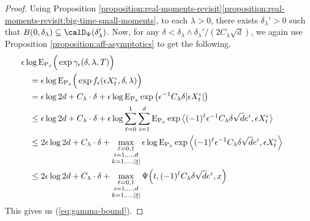\begin{proof}
  Using Proposition \ref{proposition:real-moments-revisit}\ref{proposition:real-moments-revisit:big-time-small-moments}, to each $\lambda > 0$, there exists $\delta_\lambda' > 0$ such that $B(0,\delta_\lambda) \subseteq \momentSpace(\delta_\lambda')$.
  Now, for any $\delta < \delta_\lambda \wedge \delta_\lambda'/(2C_\lambda\sqrt d)$, we again use Proposition \ref{proposition:aff-asymptotics} to get the following.
  \begin{align*}
    &\hspace{-1em}\epsilon\log{\operatorname{E}}_{{\operatorname{P}}_x}\Big( \exp \gamma_\epsilon(\delta, \lambda,T) \Big) \tag*{} \\
    &=\epsilon\log{\operatorname{E}}_{{\operatorname{P}}_x}\Big( \exp f_\epsilon(\epsilon X^\epsilon_t, \delta, \lambda) \Big) \tag*{} \\
    &= \epsilon\log 2d + C_\lambda \cdot\delta + \epsilon\log {\operatorname{E}}_{{\operatorname{P}}_x}\exp\big(\epsilon^{-1}C_\lambda\delta |\epsilon X^\epsilon_t| \big) \\
    &\leq \epsilon\log 2d + C_\lambda \cdot\delta + \epsilon\log \sum_{\ell=0}^1\sum_{i=1}^d {\operatorname{E}}_{{\operatorname{P}}_x}\exp{\big\langle (-1)^\ell\epsilon^{-1}C_\lambda \delta\sqrt d e^i , \epsilon X^\epsilon_t \big\rangle} \\
    &\leq 2\epsilon\log2d + C_\lambda \cdot \delta + \max_{\substack{\ell=0,1\\i=1,\ldots,d\\k=1,\ldots,|\underline t|}} \epsilon\log{\operatorname{E}}_{{\operatorname{P}}_x} \exp{\Big\langle  (-1)^\ell \epsilon^{-1} C_\lambda\delta \sqrt d e^i , \epsilon X^\epsilon_t \Big\rangle} \\
    &\leq 2\epsilon\log2d + C_\lambda \cdot \delta + \max_{\substack{\ell=0,1\\i=1,\ldots,d\\k=1,\ldots,|\underline t|}} \Psi\Big( t, (-1)^\ell C_\lambda \delta\sqrt d e^i, x\Big)
  \end{align*}
  This gives us (\ref{eq:gamma-bound}).
\end{proof}
